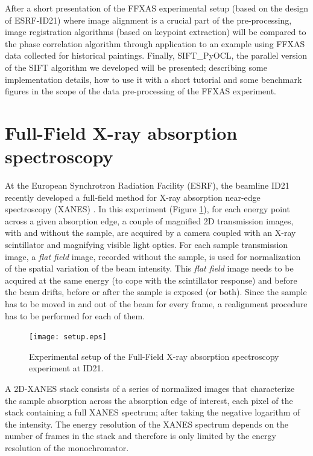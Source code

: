 \documentclass[preprint]{iucr}
\begin{document}
After a short presentation of the FFXAS
experimental setup (based on the design of ESRF-ID21) where image alignment is a
crucial part of the pre-processing, image registration algorithms (based on
keypoint extraction) will 
be compared to the phase correlation algorithm through application to an example
using FFXAS data collected for historical paintings.
Finally, SIFT\_PyOCL, the parallel version of the SIFT algorithm we developed
will be presented; describing some implementation details, how to use it
with a short tutorial and some benchmark figures in the scope of the data
pre-processing of the FFXAS experiment.

\section{Full-Field X-ray absorption spectroscopy}
At the European Synchrotron Radiation Facility (ESRF), the beamline ID21
recently developed a full-field method for X-ray absorption near-edge
spectroscopy (XANES) \cite{andrade,fullfield}.
In this experiment (Figure \ref{setup}), for each energy point across a given
absorption edge, a couple of magnified 2D transmission images, with and
without the sample, are acquired by a camera coupled with an
X-ray scintillator and magnifying visible light optics.
For each sample transmission image, a \emph{flat field} image,
recorded without the sample, is used for normalization of the spatial
variation of the beam intensity. 
This \emph{flat field} image needs to be acquired at the same energy (to cope
with the scintillator response) and before the beam drifts, before or
after the sample is exposed (or both). 
Since the sample has to be moved in and out of the beam for every frame, a 
realignment procedure has to be performed for each of them.

\begin{figure}
\label{setup}
\begin{center}
\texttt{[image: setup.eps]}
\caption{Experimental setup of the Full-Field X-ray absorption
spectroscopy experiment at ID21.}
\end{center}
\end{figure}

A 2D-XANES stack consists of a series of normalized images that
characterize the sample absorption across the absorption edge of interest, each pixel of the
stack containing a full XANES spectrum; after taking the negative logarithm
of the intensity. 
The energy resolution of the XANES spectrum depends on the number of frames in
the stack and therefore is only limited by the energy resolution of the monochromator.
\end{document}

